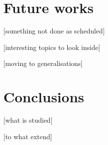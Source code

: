 \documentclass[12pt,a4paper]{report}
\begin{document}





















\chapter{Future works}

[something not done as scheduled]

[interesting topics to look inside]

[moving to generalisations]









\chapter{Conclusions}

[what is studied]

[to what extend]
\end{document}

